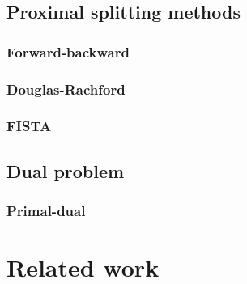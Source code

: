 \section{Proximal splitting methods}

\subsection{Forward-backward}

\subsection{Douglas-Rachford}

\subsection{FISTA}

\section{Dual problem}

\subsection{Primal-dual}


\chapter{Related work} \label{chap:related_work}
